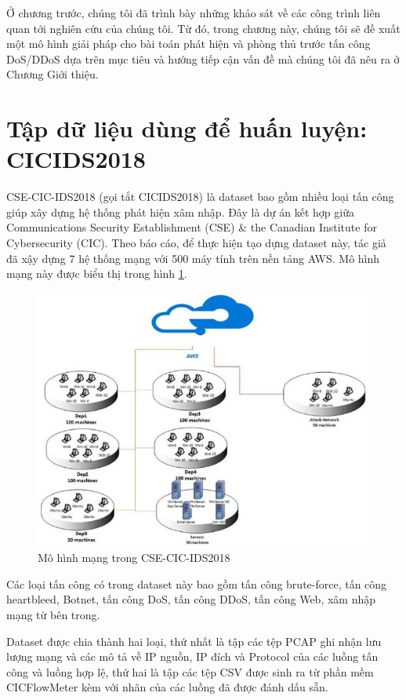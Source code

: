 Ở chương trước, chúng tôi đã trình bày những khảo sát về các công trình liên quan tới nghiên cứu của chúng tôi. Từ đó, trong chương này, chúng tôi sẽ đề xuất một mô hình giải pháp cho bài toán phát hiện và phòng thủ trước tấn công DoS/DDoS dựa trên mục tiêu và hướng tiếp cận vấn đề mà chúng tôi đã nêu ra ở Chương Giới thiệu.

\section{Tập dữ liệu dùng để huấn luyện: CICIDS2018}
\label{ids-dataset}

CSE-CIC-IDS2018 (gọi tắt CICIDS2018) \cite{36a-ids2018} là dataset bao gồm nhiều loại tấn công giúp xây dựng hệ thống phát hiện xâm nhập. Đây là dự án kết hợp giữa Communications Security Establishment (CSE) \& the Canadian Institute for Cybersecurity (CIC). Theo báo cáo, để thực hiện tạo dựng dataset này, tác giả đã xậy dựng 7 hệ thống mạng với 500 máy tính trên nền tảng AWS. Mô hình mạng này được biểu thị trong hình \ref{fig:aws-ids2018}.

\begin{figure}[ht!]
	\centering
	\includegraphics[width=0.75\linewidth]{fig/aws-ids2018.png}
	\caption{Mô hình mạng trong CSE-CIC-IDS2018}
	\label{fig:aws-ids2018}
\end{figure}

Các loại tấn công có trong dataset này bao gồm tấn công brute-force, tấn công heartbleed, Botnet, tấn công DoS, tấn công DDoS, tấn công Web, xâm nhập mạng từ bên trong.

Dataset được chia thành hai loại, thứ nhất là tập các tệp PCAP ghi nhận lưu lượng mạng và các mô tả về IP nguồn, IP đích và Protocol của các luồng tấn công và luồng hợp lệ, thứ hai là tập các tệp CSV được sinh ra từ phần mềm CICFlowMeter \cite{37-cicflowmeter} kèm với nhãn của các luồng đã được đánh dấu sẵn.

